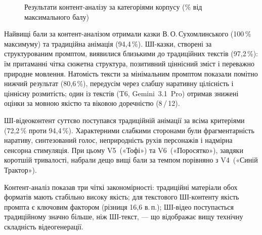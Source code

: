 \documentclass[14pt, a4paper]{extreport}
\begin{document}
\begin{figure}[htbp]
\centering
{}
\caption{Результати контент-аналізу за категоріями корпусу (\% від максимального балу)}
\end{figure}

Найвищі бали за контент-аналізом отримали казки В.\,О.\,Сухомлинського (100\,\% максимуму) та традиційна анімація (94{,}4\,\%). ШІ-казки, створені за структурованим промптом, виявилися близькими до традиційних текстів (97{,}2\,\%): їм притаманні чітка сюжетна структура, позитивний ціннісний зміст і переважно природне мовлення. Натомість тексти за мінімальним промптом показали помітно нижчий результат (80{,}6\,\%), передусім через слабшу наративну цілісність і ціннісну розмитість; один із текстів (T6, Gemini~3.1~Pro) отримав знижені оцінки за мовною якістю та віковою доречністю (8\,/\,12).

ШІ-відеоконтент суттєво поступався традиційній анімації за всіма критеріями (72{,}2\,\% проти 94{,}4\,\%). Характерними слабкими сторонами були фрагментарність наративу, синтезований голос, неприродність рухів персонажів і надмірна сенсорна стимуляція. При цьому V5~(«Тофі») та V6~(«Поросятко»), завдяки коротшій тривалості, набрали дещо вищі бали за темпом порівняно з V4~(«Синій Трактор»).

Контент-аналіз показав три чіткі закономірності: традиційні матеріали обох форматів мають стабільно високу якість; для текстового ШІ-контенту якість промпта є ключовим фактором (різниця 16{,}6 в.\,п.); ШІ-відео поступається традиційному значно більше, ніж ШІ-текст, --- що відображає вищу технічну складність відеогенерації.
\end{document}
